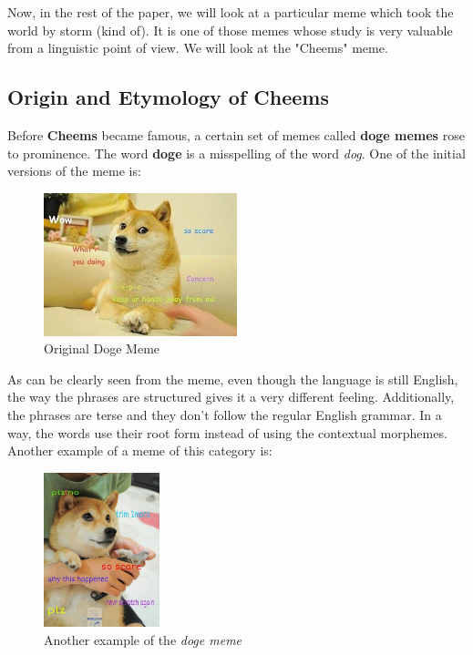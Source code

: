 \def\DevnagVersion{2.17}\documentclass{article}
\begin{document}
Now, in the rest of the paper, we will look at a particular meme which took the world by storm (kind of). It is one of those memes whose study is very valuable from a linguistic point of view. We will look at the "Cheems" meme.

\subsection{Origin and Etymology of Cheems}
Before \textbf{Cheems} became famous, a certain set of memes called \textbf{doge memes} rose to prominence. The word \textbf{doge} is a misspelling of the word \textit{dog}. One of the initial versions of the meme is:
\begin{figure}[H]
    \centering
    \includegraphics[width=0.5\textwidth]{figures/original_doge_meme.jpg}
    \caption{Original Doge Meme}
\end{figure}

As can be clearly seen from the meme, even though the language is still English, the way the phrases are structured gives it a very different feeling. Additionally, the phrases are terse and they don't follow the regular English grammar. In a way, the words use their root form instead of using the contextual morphemes. Another example of a meme of this category is:
\begin{figure}[H]
    \centering
    \includegraphics[width=0.3\textwidth]{figures/doge_2.jpg}
    \caption{Another example of the \textit{doge meme}}
\end{figure}
\end{document}

